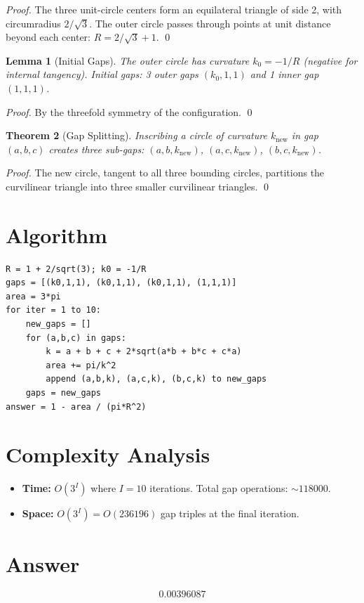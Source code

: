 \documentclass[12pt]{article}
\newtheorem{theorem}{Theorem}
\newtheorem{lemma}[theorem]{Lemma}
\begin{document}
\begin{proof}
The three unit-circle centers form an equilateral triangle of side 2, with circumradius $2/\sqrt{3}$. The outer circle passes through points at unit distance beyond each center: $R = 2/\sqrt{3} + 1$. \qed
\end{proof}

\begin{lemma}[Initial Gaps]
The outer circle has curvature $k_0 = -1/R$ (negative for internal tangency). Initial gaps: 3 outer gaps $(k_0, 1, 1)$ and 1 inner gap $(1, 1, 1)$.
\end{lemma}

\begin{proof}
By the threefold symmetry of the configuration. \qed
\end{proof}

\begin{theorem}[Gap Splitting]
Inscribing a circle of curvature $k_{\text{new}}$ in gap $(a, b, c)$ creates three sub-gaps: $(a, b, k_{\text{new}})$, $(a, c, k_{\text{new}})$, $(b, c, k_{\text{new}})$.
\end{theorem}

\begin{proof}
The new circle, tangent to all three bounding circles, partitions the curvilinear triangle into three smaller curvilinear triangles. \qed
\end{proof}

\section{Algorithm}

\begin{verbatim}
R = 1 + 2/sqrt(3); k0 = -1/R
gaps = [(k0,1,1), (k0,1,1), (k0,1,1), (1,1,1)]
area = 3*pi
for iter = 1 to 10:
    new_gaps = []
    for (a,b,c) in gaps:
        k = a + b + c + 2*sqrt(a*b + b*c + c*a)
        area += pi/k^2
        append (a,b,k), (a,c,k), (b,c,k) to new_gaps
    gaps = new_gaps
answer = 1 - area / (pi*R^2)
\end{verbatim}

\section{Complexity Analysis}

\begin{itemize}
    \item \textbf{Time:} $O(3^I)$ where $I = 10$ iterations. Total gap operations: $\sim 118000$.
    \item \textbf{Space:} $O(3^I) = O(236196)$ gap triples at the final iteration.
\end{itemize}

\section{Answer}

\[
\boxed{0.00396087}
\]
\end{document}
